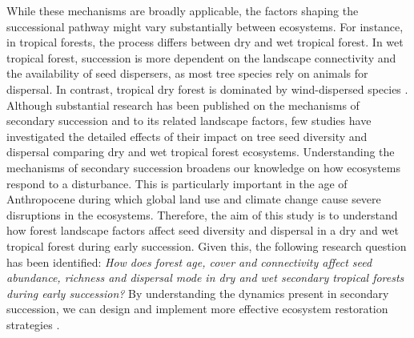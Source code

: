 While these mechanisms are broadly applicable, the factors shaping the successional pathway might vary substantially between ecosystems. For instance, in tropical forests, the process differs between dry and wet tropical forest. In wet tropical forest, succession is more dependent on the landscape connectivity and the availability of seed dispersers, as most tree species rely on animals for dispersal. In contrast, tropical dry forest is dominated by wind-dispersed species \citep{hordijkLandUseHistory2024, lohbeckSuccessionalChangesFunctional2013}. Although substantial research has been published on the mechanisms of secondary succession and to its related landscape factors, few studies have investigated the detailed effects of their impact on tree seed diversity and dispersal comparing dry and wet tropical forest ecosystems. Understanding the mechanisms of secondary succession broadens our knowledge on how ecosystems respond to a disturbance. This is particularly important in the age of Anthropocene during which global land use and climate change cause severe disruptions in the ecosystems.  Therefore, the aim of this study is to understand how forest landscape factors affect seed diversity and dispersal in a dry and wet tropical forest during early succession. Given this, the following research question has been identified: \textit{How does forest age, cover and connectivity affect seed abundance, richness and dispersal mode in dry and wet secondary tropical forests during early succession?} By understanding the dynamics present in secondary succession, we can design and implement more effective ecosystem restoration strategies \citep{poorterSuccessionalTheories2023}.


